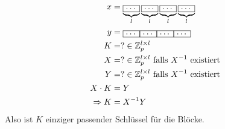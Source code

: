 \documentclass[mitschriften.tex]{subfiles}
\begin{document}
\subsection{}
\subsubsection{}
\begin{align*}
  x &= \underbrace{\framebox{\ldots}}_{l}\underbrace{\framebox{\ldots}}_{l}\underbrace{\framebox{\ldots}}_{l}\underbrace{\framebox{\ldots}}_{l}\\
  y &= \framebox{\ldots}\framebox{\ldots}\framebox{\ldots}\framebox{\ldots}\\
  K &= ? \in \mathbb{Z}_{p}^{l\times l}\\
  X &= ? \in \mathbb{Z}_{p}^{l\times l} \text{ falls  } X^{-1} \text{ existiert  }\\
  Y &= ? \in \mathbb{Z}_{p}^{l\times l} \text{ falls  } X^{-1} \text{ existiert  }\\
  X \cdot K &= Y\\
  \Rightarrow K &= X^{-1}Y\\
\end{align*}
Also ist $K$ einziger passender Schlüssel für die Blöcke.
\subsection{}
\end{document}
